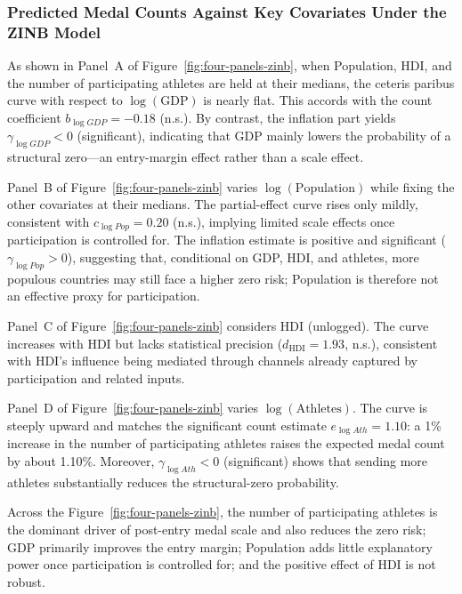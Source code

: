 \documentclass[11pt,twoside]{article}
\numberwithin{Theorem}{section}
\numberwithin{Definition}{section}
\numberwithin{Lemma}{section}
\numberwithin{Algorithm}{section}
\numberwithin{equation}{section}
\begin{document}
\subsubsection{Predicted Medal Counts Against Key Covariates Under the ZINB Model}
\label{subsubsec:fourpanels-rev}
As shown in Panel~A of Figure~\ref{fig:four-panels-zinb}, when Population, HDI, and the number of participating athletes are held at their medians, the ceteris paribus curve with respect to $\log(\mathrm{GDP})$ is nearly flat. This accords with the count coefficient $b_{\log GDP}=-0.18$ (n.s.). By contrast, the inflation part yields $\gamma_{\log GDP}<0$ (significant), indicating that GDP mainly lowers the probability of a structural zero---an entry-margin effect rather than a scale effect.

Panel~B of Figure~\ref{fig:four-panels-zinb} varies $\log(\mathrm{Population})$ while fixing the other covariates at their medians. The partial-effect curve rises only mildly, consistent with $c_{\log Pop}=0.20$ (n.s.), implying limited scale effects once participation is controlled for. The inflation estimate is positive and significant ($\gamma_{\log Pop}>0$), suggesting that, conditional on GDP, HDI, and athletes, more populous countries may still face a higher zero risk; Population is therefore not an effective proxy for participation.

Panel~C of Figure~\ref{fig:four-panels-zinb} considers HDI (unlogged). The curve increases with HDI but lacks statistical precision ($d_{\mathrm{HDI}}=1.93$, n.s.), consistent with HDI’s influence being mediated through channels already captured by participation and related inputs.

Panel~D of Figure~\ref{fig:four-panels-zinb} varies $\log(\mathrm{Athletes})$. The curve is steeply upward and matches the significant count estimate $e_{\log Ath}=1.10$: a 1\% increase in the number of participating athletes raises the expected medal count by about 1.10\%. Moreover, $\gamma_{\log Ath}<0$ (significant) shows that sending more athletes substantially reduces the structural-zero probability.

Across the Figure~\ref{fig:four-panels-zinb}, the number of participating athletes is the dominant driver of post-entry medal scale and also reduces the zero risk; GDP primarily improves the entry margin; Population adds little explanatory power once participation is controlled for; and the positive effect of HDI is not robust.
\end{document}
